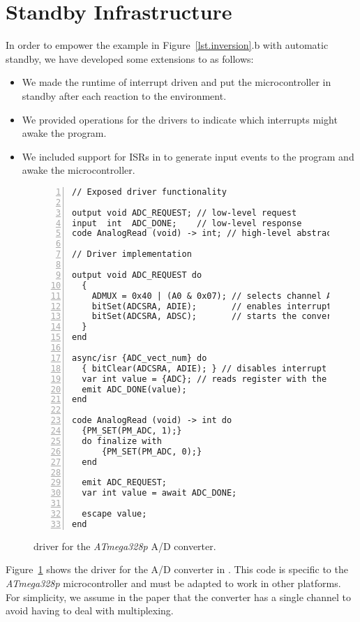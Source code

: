 \section{Standby Infrastructure}
\label{sec.standby}

In order to empower the example in Figure~\ref{lst.inversion}.b with automatic
standby, we have developed some extensions to \CEU as follows:
%
\begin{itemize}
\item We made the runtime of \CEU interrupt driven and put the microcontroller
      in standby after each reaction to the environment.
\item We provided operations for the drivers to indicate which interrupts might
      awake the program.
\item We included support for ISRs in \CEU to generate input events to the
      program and awake the microcontroller.
\end{itemize}

\begin{figure}[t]
\vspace{2mm}
\begin{lstlisting}[numbers=left]
// Exposed driver functionality

output void ADC_REQUEST; // low-level request
input  int  ADC_DONE;    // low-level response
code AnalogRead (void) -> int; // high-level abstraction

// Driver implementation

output void ADC_REQUEST do
  {
    ADMUX = 0x40 | (A0 & 0x07); // selects channel A0
    bitSet(ADCSRA, ADIE);       // enables interrupt
    bitSet(ADCSRA, ADSC);       // starts the conversion
  }
end

async/isr {ADC_vect_num} do
  { bitClear(ADCSRA, ADIE); } // disables interrupt
  var int value = {ADC}; // reads register with the value
  emit ADC_DONE(value);
end

code AnalogRead (void) -> int do
  {PM_SET(PM_ADC, 1);}
  do finalize with
      {PM_SET(PM_ADC, 0);}
  end

  emit ADC_REQUEST;
  var int value = await ADC_DONE;

  escape value;
end
\end{lstlisting}
\caption{ \CEU driver for the \emph{ATmega328p} A/D converter.
\label{lst.adc}
}
\end{figure}

Figure~\ref{lst.adc} shows the driver for the A/D converter in \CEU.
This code is specific to the \emph{ATmega328p} microcontroller and must be
adapted to work in other platforms.
For simplicity, we assume in the paper that the converter has a single channel
to avoid having to deal with multiplexing.

